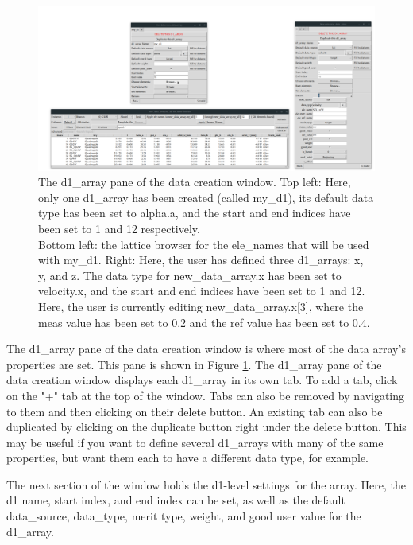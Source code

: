\begin{figure}
\centering
\includegraphics[width=12cm]{figures/create_d1.pdf}
\caption[The d1_array pane of the data creation window.]{The d1_array pane of the data creation window. Top left: Here, only one d1_array has been created (called my_d1), its default data type has been set to alpha.a, and the start and end indices have been set to 1 and 12 respectively.  \\
Bottom left: the lattice browser for the ele_names that will be used with my_d1.
Right: Here, the user has defined three d1_arrays: x, y, and z.
The data type for new_data_array.x has been set to velocity.x, and the start and end indices have been set to 1 and 12.
Here, the user is currently editing new_data_array.x[3], where the meas value has been set to 0.2 and the ref value has been set to 0.4.}
\label{fig:gui.create.data.d1}
\end{figure}

The d1_array pane of the data creation window is where most of the data array's properties are set.
This pane is shown in Figure \ref{fig:gui.create.data.d1}.
The d1_array pane of the data creation window displays each d1_array in its own tab.
To add a tab, click on the "+" tab at the top of the window.
Tabs can also be removed by navigating to them and then clicking on their delete button.
An existing tab can also be duplicated by clicking on the duplicate button right under the delete button.
This may be useful if you want to define several d1_arrays with many of the same properties, but want them each to have a different data type, for example.

The next section of the window holds the d1-level settings for the array.
Here, the d1 name, start index, and end index can be set, as well as the default data_source, data_type, merit type, weight, and good user value for the d1_array.

